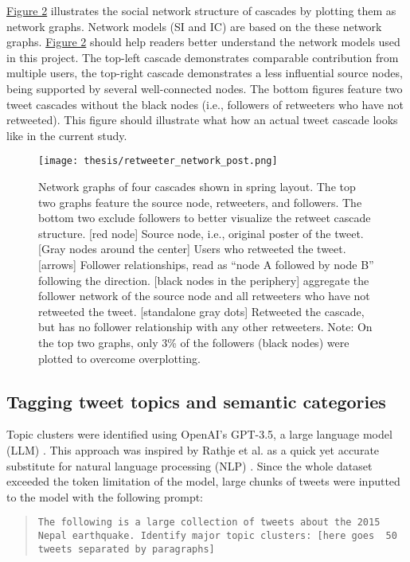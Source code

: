 \documentclass[11pt,a4paper]{article}
\begin{document}
        \hyperlink{fig:network}{Figure 2} illustrates the social network structure of cascades by plotting them as network graphs. Network models (SI and IC) are based on the these network graphs. \hyperlink{fig:network}{Figure 2} should help readers better understand the network models used in this project. The top-left cascade demonstrates comparable contribution from multiple users, the top-right cascade demonstrates a less influential source nodes, being supported by several well-connected nodes. The bottom figures feature two tweet cascades without the black nodes (i.e., followers of retweeters who have not retweeted). This figure should illustrate what how an actual tweet cascade looks like in the current study.
        
        \begin{figure}[H]
            \hypertarget{fig:network}{}
            \centering
            \texttt{[image: thesis/retweeter\_network\_post.png]}\\
            \caption{Network graphs of four cascades shown in spring layout. The top two graphs feature the source node, retweeters, and followers. The bottom two exclude followers to better visualize the retweet cascade structure. [red node] Source node, i.e., original poster of the tweet. [Gray nodes around the center] Users who retweeted the tweet. [arrows] Follower relationships, read as \enquote{node A followed by node B} following the direction. [black nodes in the periphery] aggregate the follower network of the source node and all retweeters who have not retweeted the tweet. [standalone gray dots] Retweeted the cascade, but has no follower relationship with any other retweeters. Note: On the top two graphs, only 3\% of the followers (black nodes) were plotted to overcome overplotting.}                \label{fig:enter-label}
        \end{figure}
    
    \subsection{Tagging tweet topics and semantic categories}
    \hypertarget{sec:tagging-tweet-topic}{}
    Topic clusters were identified using OpenAI's GPT-3.5, a large language model (LLM) \cite{openai_llc_openai_2023}. This approach was inspired by Rathje et al. as a quick yet accurate substitute for natural language processing (NLP) \cite{rathje_gpt_2023}. Since the whole dataset exceeded the token limitation of the model, large chunks of tweets were inputted to the model with the following prompt: 
    \begin{quote}
         \texttt{The following is a large collection of tweets about the 2015 Nepal earthquake. Identify major  topic clusters: [here goes ~50 tweets separated by paragraphs]}   
    \end{quote}{}
\end{document}
